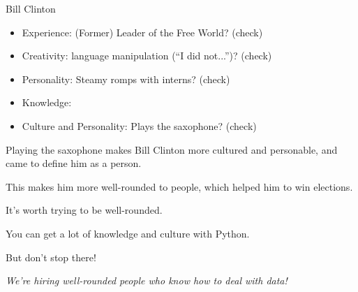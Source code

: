 \documentclass{beamer}
\begin{document}
\begin{frame}{Bill Clinton}

\begin{itemize}
  \item Experience: (Former) Leader of the Free World? (check)
  \item Creativity: language manipulation (``I did not...'')? (check)
  \item Personality: Steamy romps with interns? (check)
  \item Knowledge: 
  \item \alert{Culture and Personality}: Plays the saxophone? (check)
\end{itemize}

Playing the saxophone makes Bill Clinton more cultured and personable, and came to define him as a person.

This makes him more well-rounded to people, which helped him to win elections.

\end{frame}

\begin{frame}

It's worth trying to be well-rounded.

You can get a lot of knowledge and culture with Python.

But don't stop there!

\vskip 1cm
\textit{We're hiring well-rounded people who know how to deal with data!}

\end{frame}
\end{document}
